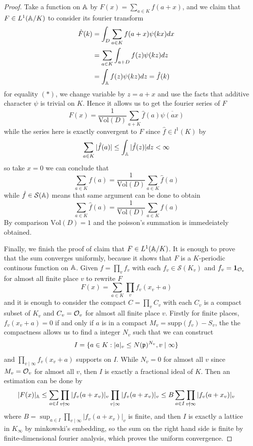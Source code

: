 \begin{proof}
    Take a function on \(\mathbb{A}\) by \(F(x) = \sum_{a \in K}f(a+x)\), and we claim that \(F \in L^1(\mathbb{A}/K)\) to consider its fourier transform 
    \begin{align*}
    \hat{F}(k) &= \int_{D} \sum_{a \in K}f(a+x)\psi(kx) dx \\
    &= \sum_{a \in K}\int_{a+D} f(z)\psi(kz) dz \\
    &= \int_{\mathbb{A}} f(z)\psi(kz) dz = \hat{f}(k)
    \end{align*}
    for equality \((*)\), we change variable by \(z = a+x\) and use the facts that additive character \(\psi\) is trivial on \(K\). Hence it allows us to get the fourier series of \(F\) 
    \[F(x) = \frac{1}{\mathrm{Vol}(D)} \sum_{a +K }\hat{f}(a)\overline{\psi(ax)}\]
    while the series here is exactly convergent to \(F\) since \(\hat{f} \in l^1(K)\) by
    \[\sum_{a \in K}|\hat{f}(a)| \leq \int_{\mathbb{A}} |\hat{f}(z)| dz < \infty \]
    so take \(x = 0\) we can conclude that
    \[\sum_{a \in K}f(a) = \frac{1}{\mathrm{Vol}(D)} \sum_{a \in K}\hat{f}(a)\]
    while \(\hat{f} \in \mathcal{S}(\mathbb{A})\) means that same argument can be done to  obtain
    \[\sum_{a \in K}\hat{f}(a) = \frac{1}{\mathrm{Vol}(D)}\sum_{a \in K}f(a)\]
    By comparison \(\mathrm{Vol}(D) = 1\) and the poisson's summation is immedeiately obtained.

    Finally, we finish the proof of claim that \(F \in L^1(\mathbb{A}/K)\). It is enough to prove that the sum converges uniformly, because it shows that \(F\) is a \(K\)-periodic continous function on \(\mathbb{A}\). Given \(f = \prod_v f_v\) with each \(f_v \in \mathcal{S}(K_v)\) and \(f_v = \mathbf{1}_{\mathcal{O}_v}\) for almost all finite place \(v\) to rewrite \(F\)
    \[F(x) = \sum_{a \in K}\prod_v f_v(x_v + a)\] 
    and it is enough to consider the compact \(C = \prod_v C_v\) with each \(C_v\) is a compact subset of \(K_v\) and \(C_v = \mathcal{O}_v\) for almost all finite place \(v\). Firstly for finite places, \(f_v(x_v+a) = 0\) if and only if \(a\) is in a compact \( M_v  = \mathrm{supp}(f_v)-S_v\), the the compactness allows us to find a integer \(N_v\) such that we can construct
    \[I = \{a \in K : |a|_v \leq N(\mathfrak{p})^{N_v}, v \mid \infty \}\]
    and \(\prod_{v \mid \infty}f_v(x_v+a)\) supports on \(I\). While \(N_v = 0\) for almost all \(v\) since \(M_v = \mathcal{O}_v\) for almost all \(v\), then \(I\) is exactly a fractional ideal of \(K\). Then an estimation can be done by
    \[|F(x)|_{\mathbb{A}} \leq \sum_{a \in I} \prod_{v \nmid \infty}|f_v(a+x_v)|_v \prod_{v \mid \infty}|f_v(a+x_v)|_v  \leq B \sum_{a \in I} \prod_{v \nmid \infty}|f_v(a+x_v)|_v\]
    where \(B = \sup_{a \in I}\prod_{v \mid \infty}|f_v(a+x_v)|_v\) is finite, and then \(I\) is exactly a lattice in \(K_{\infty}\) by minkowski's embedding, so the sum on the right hand side is finite by finite-dimensional fourier analysis, which proves the uniform convergence.
\end{proof}

